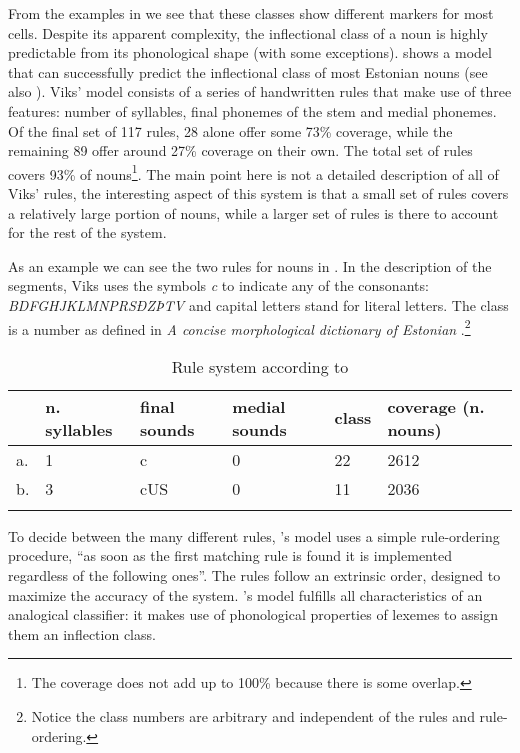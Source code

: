 From the examples in  we see that these classes show different markers for most cells. Despite its apparent complexity, the inflectional class of a noun is highly predictable from its phonological shape (with some exceptions). \textcite{Viks.1995} shows a model that can successfully predict the inflectional class of most Estonian nouns (see also \citealt{Viks.1994}). Viks' model consists of a series of handwritten rules that make use of three features: number of syllables, final phonemes of the stem and medial phonemes. Of the final set of 117 rules, 28 alone offer some 73\% coverage, while the remaining 89 offer around 27\% coverage on their own. The total set of rules covers 93\% of nouns\footnote{The coverage does not add up to 100\% because there is some overlap.}. The main point here is not a detailed description of all of Viks' rules, the interesting aspect of this system is that a small set of rules covers a relatively large portion of nouns, while a larger set of rules is there to account for the rest of the system.

As an example we can see the two rules for nouns in . In the description of the segments, Viks uses the symbols \textit{c} to indicate any of the consonants: \textit{BDFGHJKLMNPRSÐZÞTV} and capital letters stand for literal letters. The class is a number as defined in \textit{A concise morphological dictionary of Estonian} \autocite{Viks.1992}.\footnote{Notice the class numbers are arbitrary and independent of the rules and rule-ordering.}

\begin{table}[t]
    \centering
    \caption{Rule system according to \textcite{Viks.1992}}\label{tab:exe-rules-viks}
    \begin{tabular}[t]{llllll}
      \lsptoprule
      & n. syllables & final sounds & medial sounds & class & coverage (n. nouns) \\
      \midrule
      a. & 1                   & c            & 0             & 22            & 2612          \\
      b. & 3                   & cUS          & 0             & 11            & 2036          \\
      \lspbottomrule
    \end{tabular}
\end{table}

To decide between the many different rules, \citet{Viks.1995}'s model uses a simple rule-ordering procedure, ``as soon as the first matching rule is found it is implemented regardless of the following ones''. The rules follow an extrinsic order, designed to maximize the accuracy of the system. \citet{Viks.1995}'s model fulfills all characteristics of an analogical classifier: it makes use of phonological properties of lexemes to assign them an inflection class.

